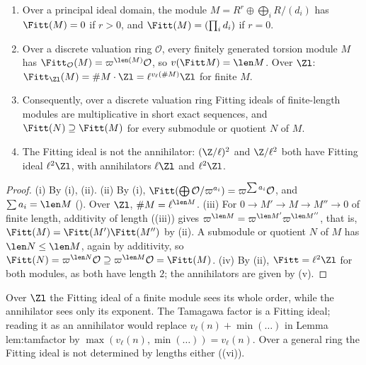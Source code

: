 \begin{theorem}\label{thm:modules:fitting-dvr}
\begin{enumerate}[label=(\roman*)]
\item Over a principal ideal domain, the module $M=R^r\oplus\bigoplus_iR/(d_i)$ has $\Fitt(M)=0$ if $r>0$, and $\Fitt(M)=(\prod_id_i)$ if $r=0$.
\item Over a discrete valuation ring $\mathcal O$, every finitely generated torsion module $M$ has $\Fitt_{\mathcal O}(M)=\varpi^{\len(M)}\mathcal O$, so $v(\Fitt M)=\len M$.
Over $\Zl$: $\Fitt_{\Zl}(M)=\#M\cdot\Zl=\ell^{v_\ell(\#M)}\Zl$ for finite $M$.
\item Consequently, over a discrete valuation ring Fitting ideals of finite-length modules are multiplicative in short exact sequences,
and $\Fitt(N)\supseteq\Fitt(M)$ for every submodule or quotient $N$ of $M$.
\item The Fitting ideal is not the annihilator: $(\Z/\ell)^2$ and $\Z/\ell^2$ both have Fitting ideal $\ell^2\Zl$, with annihilators $\ell\Zl$ and $\ell^2\Zl$.
\end{enumerate}
\end{theorem}

\begin{proof}
(i) By (i), (ii). (ii) By (i), $\Fitt(\bigoplus\mathcal O/\varpi^{a_i})=\varpi^{\sum a_i}\mathcal O$, and $\sum a_i=\len M$
(). Over $\Zl$, $\#M=\ell^{\len M}$. (iii) For $0\to M'\to M\to M''\to0$ of finite length, additivity of length
((iii)) gives $\varpi^{\len M}=\varpi^{\len M'}\varpi^{\len M''}$, that is, $\Fitt(M)=\Fitt(M')\Fitt(M'')$ by (ii). A submodule or
quotient $N$ of $M$ has $\len N\le\len M$, again by additivity, so $\Fitt(N)=\varpi^{\len N}\mathcal O\supseteq\varpi^{\len M}\mathcal O=\Fitt(M)$. (iv) By (ii),
$\Fitt=\ell^2\Zl$ for both modules, as both have length $2$; the annihilators are given by (v).
\end{proof}

\begin{warning}\label{warn:modules:fitt-ann}
Over $\Zl$ the Fitting ideal of a finite module sees its whole order, while the annihilator sees only its exponent. The Tamagawa factor is a
Fitting ideal; reading it as an annihilator would replace $v_\ell(n)+\min(\dots)$ in Lemma lem:tamfactor by $\max(v_\ell(n),\min(\dots))=v_\ell(n)$. Over a general ring the Fitting ideal is not determined by lengths either
((vi)).
\end{warning}

